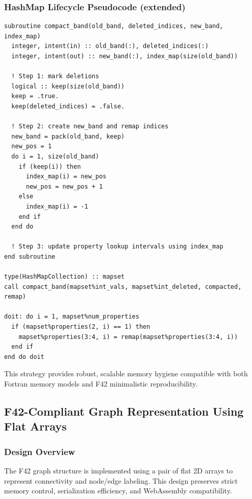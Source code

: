 \documentclass{article}
\begin{document}
\subsubsection{HashMap Lifecycle Pseudocode (extended)}

\begin{verbatim}
subroutine compact_band(old_band, deleted_indices, new_band, index_map)
  integer, intent(in) :: old_band(:), deleted_indices(:)
  integer, intent(out) :: new_band(:), index_map(size(old_band))

  ! Step 1: mark deletions
  logical :: keep(size(old_band))
  keep = .true.
  keep(deleted_indices) = .false.

  ! Step 2: create new_band and remap indices
  new_band = pack(old_band, keep)
  new_pos = 1
  do i = 1, size(old_band)
    if (keep(i)) then
      index_map(i) = new_pos
      new_pos = new_pos + 1
    else
      index_map(i) = -1
    end if
  end do

  ! Step 3: update property lookup intervals using index_map
end subroutine

type(HashMapCollection) :: mapset
call compact_band(mapset%int_vals, mapset%int_deleted, compacted, remap)

doit: do i = 1, mapset%num_properties
  if (mapset%properties(2, i) == 1) then
    mapset%properties(3:4, i) = remap(mapset%properties(3:4, i))
  end if
end do doit
\end{verbatim}

This strategy provides robust, scalable memory hygiene compatible with both
Fortran memory models and F42 minimalistic reproducibility.

\subsection{F42-Compliant Graph Representation Using Flat Arrays}

\subsubsection{Design Overview}

The F42 graph structure is implemented using a pair of flat 2D arrays to represent connectivity and node/edge labeling. This design preserves strict memory control, serialization efficiency, and WebAssembly compatibility.
\end{document}
